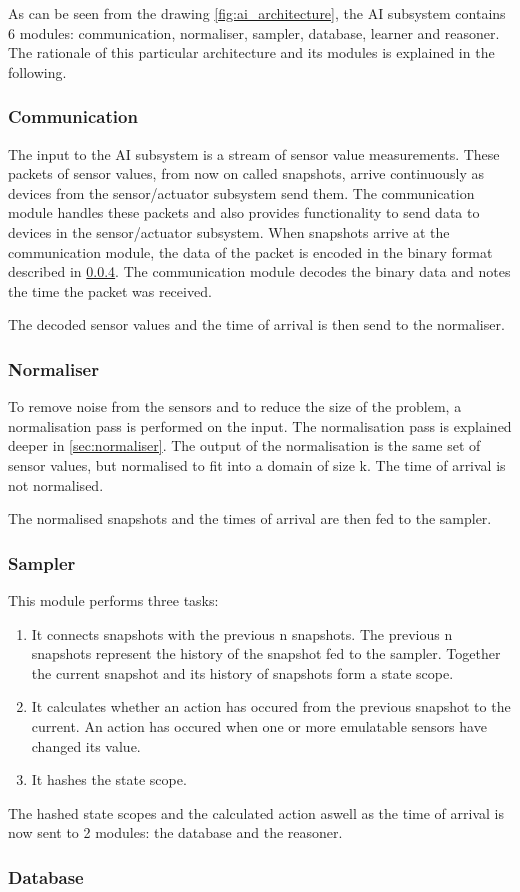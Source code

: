 As can be seen from the drawing \cref{fig:ai_architecture}, the AI subsystem contains 6 modules: communication, normaliser, sampler, database, learner and reasoner. The rationale of this particular architecture and its modules is explained in the following.

\subsubsection{Communication}
The input to the AI subsystem is a stream of sensor value measurements. These packets of sensor values, from now on called snapshots, arrive continuously as devices from the sensor/actuator subsystem send them. The communication module handles these packets and also provides functionality to send data to devices in the sensor/actuator subsystem. When snapshots arrive at the communication module, the data of the packet is encoded in the binary format described in \cref{}. The communication module decodes the binary data and notes the time the packet was received.

The decoded sensor values and the time of arrival is then send to the normaliser.

\subsubsection{Normaliser}
To remove noise from the sensors and to reduce the size of the problem, a normalisation pass is performed on the input. The normalisation pass is explained deeper in \cref{sec:normaliser}. The output of the normalisation is the same set of sensor values, but normalised to fit into a domain of size k. The time of arrival is not normalised.

The normalised snapshots and the times of arrival are then fed to the sampler.

\subsubsection{Sampler}
This module performs three tasks:

\begin{enumerate}
\item It connects snapshots with the previous n snapshots. The previous n snapshots represent the history of the snapshot fed to the sampler. Together the current snapshot and its history of snapshots form a state scope.
\item It calculates whether an action has occured from the previous snapshot to the current. An action has occured when one or more emulatable sensors have changed its value.
\item It hashes the state scope.
\end{enumerate}

The hashed state scopes and the calculated action aswell as the time of arrival is now sent to 2 modules: the database and the reasoner.

\subsubsection{Database}
